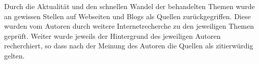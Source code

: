 Durch die Aktualität und den schnellen Wandel der behandelten Themen wurde an gewissen Stellen auf Webseiten und Blogs als Quellen zurückgegriffen. Diese wurden vom Autoren durch weitere Internetrecherche zu den jeweiligen Themen geprüft. Weiter wurde jeweils der Hintergrund des jeweiligen Autoren recherchiert, so dass nach der Meinung des Autoren die Quellen als zitierwürdig gelten.